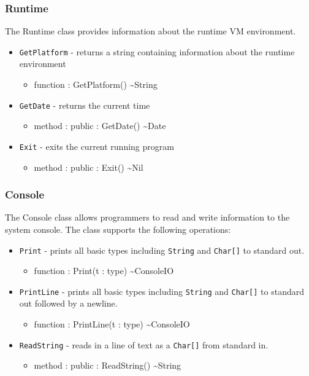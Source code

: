 \documentclass[12pt]{article}
\begin{document}
\subsubsection{Runtime}
The Runtime class provides information about the runtime VM
environment.
\begin{itemize}
\item \texttt{GetPlatform} - returns a string containing information
  about the runtime environment
  \begin{itemize}
  \item function : GetPlatform() \textasciitilde String
  \end{itemize}
\item \texttt{GetDate} - returns the current time
  \begin{itemize}
  \item method : public : GetDate() \textasciitilde Date
  \end{itemize}
\item \texttt{Exit} - exits the current running program
  \begin{itemize}
  \item method : public : Exit() \textasciitilde Nil
  \end{itemize}
\end{itemize}

\subsubsection{Console}
The Console class allows programmers to read and write information to
the system console.  The class supports the following operations:
\begin{itemize}
\item \texttt{Print} - prints all basic types including
  \texttt{String} and \texttt{Char[]} to standard out.
  \begin{itemize}
  \item function : Print(t : type) \textasciitilde ConsoleIO
  \end{itemize}
\item \texttt{PrintLine} - prints all basic types including
  \texttt{String} and \texttt{Char[]} to standard out followed by a
  newline.
  \begin{itemize}
  \item function : PrintLine(t : type) \textasciitilde ConsoleIO
  \end{itemize}
\item \texttt{ReadString} - reads in a line of text as a
  \texttt{Char[]} from standard in.
  \begin{itemize}
  \item method : public : ReadString() \textasciitilde String
  \end{itemize}
\end{itemize}
\end{document}
